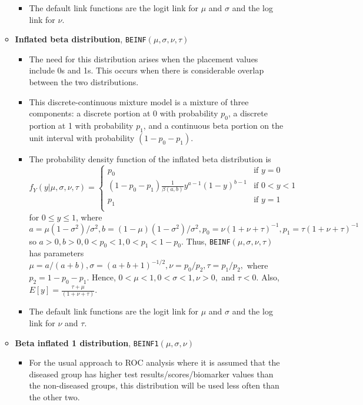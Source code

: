 \documentclass{article}
\newcommand{\si}{\sigma}
\begin{document}
\begin{enumerate}
\begin{itemize}
\begin{itemize}
            \item The default link functions are the logit link for $\mu$ and $\si$ and the log link for $\nu$.
        \end{itemize}
        \item \textbf{Inflated beta distribution}, \texttt{BEINF}$(\mu, \si, \nu, \tau)$
        \begin{itemize}
            \item The need for this distribution arises when the placement values include 0s and 1s. This occurs when there is considerable overlap between the two distributions.
            \item This discrete-continuous mixture model is a mixture of three components: a discrete portion at 0 with probability $p_0$, a discrete portion at 1 with probability $p_1$, and a continuous beta portion on the unit interval with probability $(1 - p_0 - p_1)$.
            \item The probability density function of the inflated beta distribution is 
            $$f_Y(y|\mu, \si, \nu, \tau) = \begin{cases}
            p_0 & \text{if $y = 0$} \\
            (1 - p_0 - p_1)\frac{1}{\beta(a, b)}y^{a - 1}(1 - y)^{b - 1} & \text{if $0 < y < 1$} \\
            p_1 & \text{if $y = 1$} \\
            \end{cases}$$
            for $0 \leq y \leq 1$, where $a = \mu(1 - \si^2)/\si^2, b = (1 - \mu)(1 - \si^2)/\si^2, p_0 = \nu(1 + \nu + \tau)^{-1}, p_1 = \tau(1 + \nu + \tau)^{-1}$ so $a  > 0, b > 0, 0 < p_0 < 1, 0 < p_1 < 1 - p_0$. Thus, \texttt{BEINF}$(\mu, \si, \nu, \tau)$ has parameters $\mu = a/(a + b), \si = (a + b + 1)^{-1/2}, \nu = p_0/p_2, \tau = p_1/p_2,$ where $p_2 = 1 - p_0 - p_1$. Hence, $0 < \mu < 1, 0 < \si < 1, \nu > 0,$ and $\tau < 0$. Also, $E[y] = \frac{\tau + \mu}{(1 + \nu + \tau)}$.
            \item The default link functions are the logit link for $\mu$ and $\si$ and the log link for $\nu$ and $\tau$.
        \end{itemize}
        \item \textbf{Beta inflated 1 distribution}, \texttt{BEINF1}$(\mu, \si, \nu)$
        \begin{itemize}
            \item For the usual approach to ROC analysis where it is assumed that the diseased group has higher test results/scores/biomarker values than the non-diseased groups, this distribution will be used less often than the other two. 

\end{itemize}
\end{itemize}
\end{enumerate}
\end{document}

